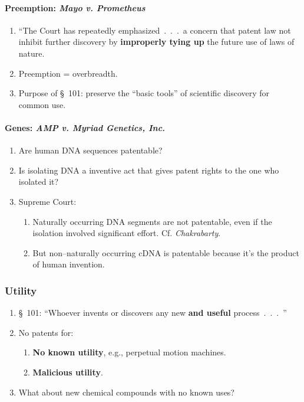 \paragraph{Preemption: \emph{Mayo v. Prometheus}}

\begin{enumerate}
    \item ``The Court has repeatedly emphasized~.~.~.~a concern that patent 
    law not inhibit further discovery by \textbf{improperly tying up} the 
    future use of laws of nature.
    \item Preemption = overbreadth.
    \item Purpose of \S\ 101: preserve the ``basic tools'' of scientific 
    discovery for common use.
\end{enumerate}

\paragraph{Genes: \emph{AMP v. Myriad Genetics, Inc.}}

\begin{enumerate}
    \item Are human DNA sequences patentable?
    \item Is isolating DNA a inventive act that gives patent rights to the one 
    who isolated it?
    \item Supreme Court:
    \begin{enumerate}
        \item Naturally occurring DNA segments are not patentable, even if the 
        isolation involved significant effort. Cf. \emph{Chakrabarty}.
        \item But non--naturally occurring cDNA is patentable because it's the 
        product of human invention.
    \end{enumerate}
\end{enumerate}

\subsubsection{Utility}

\begin{enumerate}
    \item \S\ 101: ``Whoever invents or discovers any new \textbf{and useful} 
    process~.~.~.~''
    \item No patents for:
    \begin{enumerate}
        \item \textbf{No known utility}, e.g., perpetual motion machines.
        \item \textbf{Malicious utility}.
    \end{enumerate}
    \item What about new chemical compounds with no known uses?
\end{enumerate}

